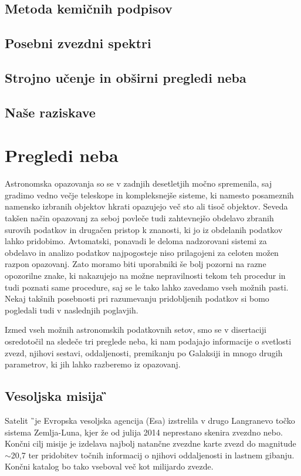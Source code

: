 \subsection{Metoda kemičnih podpisov}


\subsection{Posebni zvezdni spektri}


\subsection{Strojno učenje in obširni pregledi neba}


\subsection{Naše raziskave}


\section{Pregledi neba}
\label{sec:slo_pregledi}
Astronomska opazovanja so se v zadnjih desetletjih močno spremenila, saj gradimo vedno večje teleskope in kompleksnejše sisteme, ki namesto posameznih namensko izbranih objektov hkrati opazujejo več sto ali tisoč objektov. Seveda takšen način opazovanj za seboj povleče tudi zahtevnejšo obdelavo zbranih surovih podatkov in drugačen pristop k znanosti, ki jo iz obdelanih podatkov lahko pridobimo. Avtomatski, ponavadi le deloma nadzorovani sistemi za obdelavo in analizo podatkov najpogosteje niso prilagojeni za celoten možen razpon opazovanj. Zato moramo biti uporabniki še bolj pozorni na razne opozorilne znake, ki nakazujejo na možne nepravilnosti tekom teh procedur in tudi poznati same procedure, saj se le tako lahko zavedamo vseh možnih pasti. Nekaj takšnih posebnosti pri razumevanju pridobljenih podatkov si bomo pogledali tudi v naslednjih poglavjih.

Izmed vseh možnih astronomskih podatkovnih setov, smo se v disertaciji osredotočil na sledeče tri preglede neba, ki nam podajajo informacije o svetlosti zvezd, njihovi sestavi, oddaljenosti, premikanju po Galaksiji in mnogo drugih parametrov, ki jih lahko razberemo iz opazovanj.

\subsection{Vesoljska misija \G}
\label{sec:slo_gaia}
Satelit \G\ je Evropska vesoljska agencija (Esa) izstrelila v drugo Langranevo točko sistema Zemlja-Luna, kjer že od julija 2014 neprestano skenira zvezdno nebo. Končni cilj misije je izdelava najbolj natančne zvezdne karte zvezd do magnitude $\sim$20,7 ter pridobitev točnih informacij o njihovi oddaljenosti in lastnem gibanju. Končni katalog bo tako vseboval več kot milijardo zvezde.

